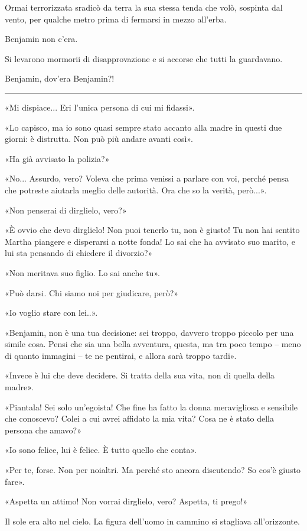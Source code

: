 Ormai terrorizzata sradicò da terra la sua stessa tenda che volò, sospinta dal vento, per qualche
metro prima di fermarsi in mezzo all'erba.

Benjamin non c'era.

Si levarono mormorii di disapprovazione e si accorse che tutti la guardavano.

Benjamin, dov'era Benjamin?!

\plainbreak{1}

«Mi dispiace... Eri l'unica persona di cui mi fidassi».

«Lo capisco, ma io sono quasi sempre stato accanto alla madre in questi due giorni: è distrutta. Non
può più andare avanti così».

«Ha già avvisato la polizia?»

«No... Assurdo, vero? Voleva che prima venissi a parlare con voi, perché pensa che potreste aiutarla
meglio delle autorità. Ora che so la verità, però...».

«Non penserai di dirglielo, vero?»

«È ovvio che devo dirglielo! Non puoi tenerlo tu, non è giusto! Tu non hai sentito Martha piangere e
disperarsi a notte fonda! Lo sai che ha avvisato suo marito, e lui sta pensando di chiedere il
divorzio?»

«Non meritava suo figlio. Lo sai anche tu».

«Può darsi. Chi siamo noi per giudicare, però?»

«Io voglio stare con lei..».

«Benjamin, non è una tua decisione: sei troppo, davvero troppo piccolo per una simile cosa. Pensi
che sia una bella avventura, questa, ma tra poco tempo -- meno di quanto immagini -- te ne pentirai,
e allora sarà troppo tardi».

«Invece è lui che deve decidere. Si tratta della sua vita, non di quella della madre».

«Piantala! Sei solo un'egoista! Che fine ha fatto la donna meravigliosa e sensibile che conoscevo?
Colei a cui avrei affidato la mia vita? Cosa ne è stato della persona che amavo?»

«Io sono felice, lui è felice. È tutto quello che conta».

«Per te, forse. Non per noialtri. Ma perché sto ancora discutendo? So cos'è giusto fare».

«Aspetta un attimo! Non vorrai dirglielo, vero? Aspetta, ti prego!»

Il sole era alto nel cielo. La figura dell'uomo in cammino si stagliava all'orizzonte.

